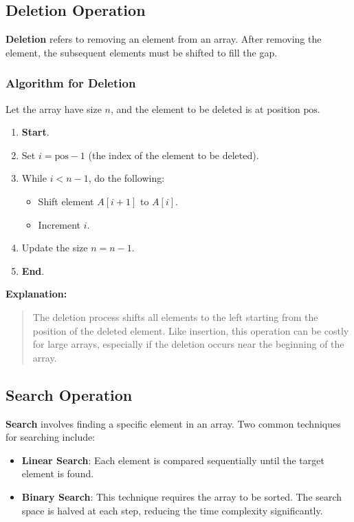 \documentclass[12pt, oneside]{book}
\begin{document}
\subsection{Deletion Operation}

\textbf{Deletion} refers to removing an element from an array. After removing the element, the subsequent elements must be shifted to fill the gap.

\subsubsection*{Algorithm for Deletion}

Let the array have size $n$, and the element to be deleted is at position $\text{pos}$.

\begin{enumerate}
	\item \textbf{Start}.
	\item Set $i = \text{pos} - 1$ (the index of the element to be deleted).
	\item While $i < n - 1$, do the following:
	\begin{itemize}
		\item Shift element $A[i + 1]$ to $A[i]$.
		\item Increment $i$.
	\end{itemize}
	\item Update the size $n = n - 1$.
	\item \textbf{End}.
\end{enumerate}

\textbf{Explanation:}
\begin{quote}
	The deletion process shifts all elements to the left starting from the position of the deleted element. Like insertion, this operation can be costly for large arrays, especially if the deletion occurs near the beginning of the array.
\end{quote}

\subsection{Search Operation}

\textbf{Search} involves finding a specific element in an array. Two common techniques for searching include:

\begin{itemize}
	\item \textbf{Linear Search}: Each element is compared sequentially until the target element is found.
	\item \textbf{Binary Search}: This technique requires the array to be sorted. The search space is halved at each step, reducing the time complexity significantly.
\end{itemize}
\end{document}
